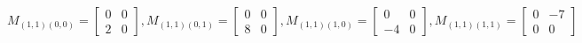$$
M_{(1,1)(0,0)}=
\left[
\begin{array}{c|c}
 0  & 0 \\
 \hline
 2  & 0 
\end{array}
\right],
M_{(1,1)(0,1)}=
\left[
\begin{array}{c|c}
0 & 0 \\
\hline
8 & 0 
\end{array}
\right],
M_{(1,1)(1,0)}=
\left[
\begin{array}{c|c}
 0  & 0\\
 \hline
 -4 & 0
\end{array}
\right],
M_{(1,1)(1,1)}=
\left[
\begin{array}{c|c}
 0  & -7 \\
 \hline
 0 & 0 
\end{array}
\right]
$$

